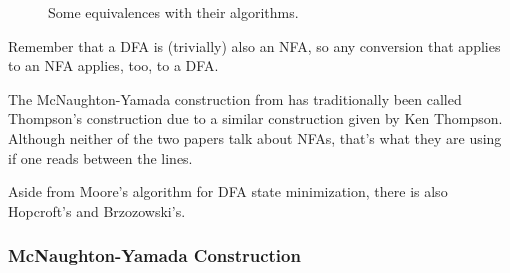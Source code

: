 \documentclass{article}
\newcommand{\emptystr}{\varepsilon}
\theoremstyle{definition}
\begin{document}
\begin{figure}[htp]
  \caption{\label{fig:lang-automata-equivalences} Some equivalences with their algorithms.}
\end{figure}

Remember that a DFA is (trivially) also an NFA, so any conversion that applies to an NFA applies, too, to a DFA.

The McNaughton-Yamada construction from \cite{MY60} has traditionally been
called Thompson's construction due to a similar construction given by Ken
Thompson. Although neither of the two papers talk about NFAs, that's what they
are using if one reads between the lines.

\iffalse %
NFA minimization (the problem of finding a minimal NFA given a certain NFA) is
PSPACE-complete~\cite{MS72}, and the solution is not guaranteed to be unique.
It cannot be efficiently approximated within a factor $O(n)$, unless
$\text{P}=\text{PSPACE}$~\cite{GS07}, and is NP-hard for acyclic unambiguous
finite automata that have a state $q$ with two transitions on the same
symbol~\cite{BM12}.
\fi

Aside from Moore's algorithm for DFA state minimization, there is also Hopcroft's and Brzozowski's.



\newpage

\subsubsection*{McNaughton-Yamada Construction}
\end{document}
